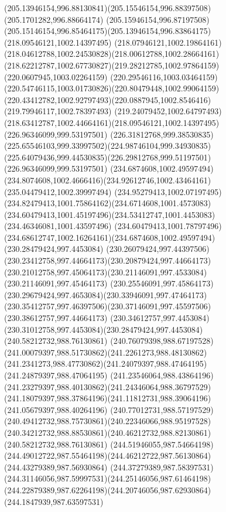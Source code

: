 {{\curveto(205.13946154,996.88130841)(205.15546154,996.88397508)(205.1701282,996.88664174)
\curveto(205.15946154,996.87197508)(205.15146154,996.85464175)(205.13946154,996.83864175)
\moveto(218.09546121,1002.14397495)
\curveto(218.07946121,1002.19864161)(218.04612788,1002.24530828)(218.00612788,1002.28664161)
\curveto(218.62212787,1002.67730827)(219.28212785,1002.97864159)(220.0607945,1003.02264159)
\curveto(220.29546116,1003.03464159)(220.54746115,1003.01730826)(220.80479448,1002.99064159)
\curveto(220.43412782,1002.92797493)(220.0887945,1002.8546416)(219.79946117,1002.78397493)
\curveto(219.24079452,1002.64797493)(218.63412787,1002.44664161)(218.09546121,1002.14397495)
\moveto(226.96346099,999.53197501)
\curveto(226.31812768,999.38530835)(225.65546103,999.33997502)(224.98746104,999.34930835)
\curveto(225.64079436,999.44530835)(226.29812768,999.51197501)(226.96346099,999.53197501)
\moveto(234.6874608,1002.49597494)
\curveto(234.8074608,1002.4666416)(234.92612746,1002.43464161)(235.04479412,1002.39997494)
\curveto(234.95279413,1002.07197495)(234.82479413,1001.75864162)(234.6714608,1001.4573083)
\curveto(234.60479413,1001.45197496)(234.53412747,1001.4453083)(234.46346081,1001.43597496)
\curveto(234.60479413,1001.78797496)(234.68612747,1002.16264161)(234.6874608,1002.49597494)
\moveto(230.28479424,997.4453084)
\curveto(230.26079424,997.44397506)(230.23412758,997.44664173)(230.20879424,997.44664173)
\curveto(230.21012758,997.45064173)(230.21146091,997.4533084)(230.21146091,997.45464173)
\curveto(230.25546091,997.45864173)(230.29679424,997.4653084)(230.33946091,997.47464173)
\curveto(230.35412757,997.46397506)(230.37146091,997.45597506)(230.38612757,997.44664173)
\curveto(230.34612757,997.4453084)(230.31012758,997.4453084)(230.28479424,997.4453084)
\moveto(240.58212732,988.76130861)
\curveto(240.76079398,988.67197528)(241.00079397,988.51730862)(241.2261273,988.48130862)
\curveto(241.2341273,988.47730862)(241.24079397,988.47464195)(241.24879397,988.47064195)
\curveto(241.23546064,988.43864196)(241.23279397,988.40130862)(241.24346064,988.36797529)
\curveto(241.18079397,988.37864196)(241.11812731,988.39064196)(241.05679397,988.40264196)
\curveto(240.77012731,988.57197529)(240.49412732,988.75730861)(240.22346066,988.95197528)
\curveto(240.34212732,988.88530861)(240.46212732,988.82130861)(240.58212732,988.76130861)
\moveto(244.51946055,987.54664198)
\curveto(244.49012722,987.55464198)(244.46212722,987.56130864)(244.43279389,987.56930864)
\curveto(244.37279389,987.58397531)(244.31146056,987.59997531)(244.25146056,987.61464198)
\curveto(244.22879389,987.62264198)(244.20746056,987.62930864)(244.1847939,987.63597531)
}}
